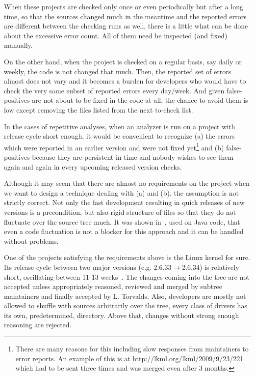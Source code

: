 \documentclass{acm_proc_article-sp}
\begin{document}
When these projects are checked only once or even periodically but after a
long time, so that the sources changed much in the meantime and the reported
errors are different between the checking runs as well, there is a little
what can be done about the excessive error count. All of them need be
inspected (and fixed) manually.

On the other hand, when the project is checked on a regular basis, say daily
or weekly, the code is not changed that much. Then, the reported set of errors
almost does not vary and it becomes a burden for developers who would
have to check the very same subset of reported errors every day/week. And
given false-positives are not about to be fixed in the code at all, the chance
to avoid them is low except removing the files listed from the next to-check
list.

In the cases of repetitive analyses, when an analyzer is run on a project with
release cycle short enough, it would be convenient to recognize (a) the errors
which were reported in an earlier version and were not fixed
yet\footnote{There are many reasons for this including slow responses from
maintainers to error reports. An example of this is at
\url{http://lkml.org/lkml/2009/9/23/221} which had to be sent three times and
was merged even after 3 months.} and (b) false-positives because they are
persistent in time and nobody wishes to see them again and again in every
upcoming released version checks.

Although it may seem that there are almost no requirements on the project when
we want to design a technique dealing with (a) and (b), the assumption is not
strictly correct. Not only the fast development resulting in quick releases of
new versions is a precondition, but also rigid structure of files so that they
do not fluctuate over the source tree much. It was shown in~\cite{tracking},
used on Java code, that even a code fluctuation is not a blocker for this
approach and it can be handled without problems.

One of the projects satisfying the requirements above is the Linux kernel for
sure. Its release cycle between two major versions (e.g.
2.6.33$\rightarrow$2.6.34) is relatively short, oscillating between 11-13
weeks~\cite{linuxdev}. The changes coming into the tree are not accepted
unless appropriately reasoned, reviewed and merged by subtree maintainers and
finally accepted by L. Torvalds. Also, developers are mostly not allowed to
shuffle with sources arbitrarily over the tree, every class of drivers has its
own, predetermined, directory. Above that, changes without strong enough
reasoning are rejected.
\end{document}
